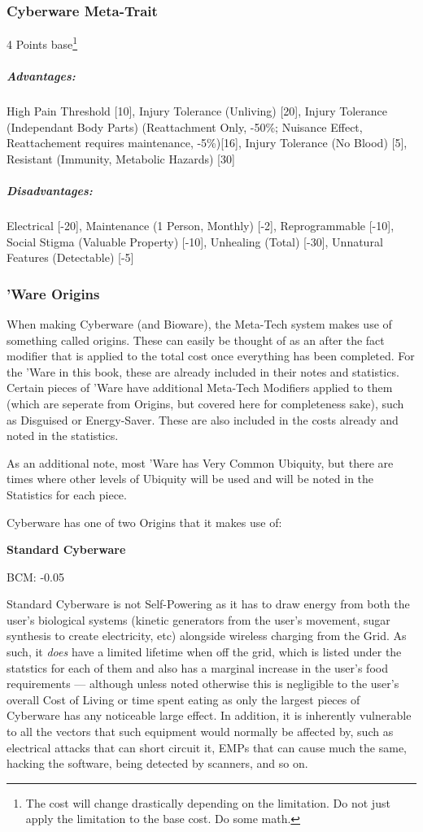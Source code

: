 \begin{multicols*}{3}
	\subsubsection*{Cyberware Meta-Trait}
	\begin{flushright}
		4 Points base\footnote{The cost will change drastically depending on the limitation. Do not just apply the limitation to the base cost. Do some math.}
	\end{flushright}
	\subparagraph{Advantages:}
	High Pain Threshold [10], Injury Tolerance (Unliving) [20], Injury Tolerance (Independant Body Parts) (Reattachment Only, -50\%; Nuisance Effect, Reattachement requires maintenance, -5\%)[16], Injury Tolerance (No Blood) [5], Resistant (Immunity, Metabolic Hazards) [30]
	\subparagraph{Disadvantages:}
	Electrical [-20], Maintenance (1 Person, Monthly) [-2], Reprogrammable [-10], Social Stigma (Valuable Property) [-10], Unhealing (Total) [-30], Unnatural Features (Detectable) [-5]
	
	\subsubsection{'Ware Origins}
	
	When making Cyberware (and Bioware), the \GURPS Meta-Tech system makes use of something called origins. These can easily be thought of as an after the fact modifier that is applied to the total cost once everything has been completed. For the 'Ware in this book, these are already included in their notes and statistics. Certain pieces of 'Ware have additional Meta-Tech Modifiers applied to them (which are seperate from Origins, but covered here for completeness sake), such as Disguised or Energy-Saver. These are also included in the costs already and noted in the statistics. 
	
	As an additional note, most 'Ware has Very Common Ubiquity, but there are times where other levels of Ubiquity will be used and will be noted in the Statistics for each piece.
	
	Cyberware has one of two Origins that it makes use of: 
	
	\noindent
	\textbf{Standard Cyberware}
	
	BCM: -0.05
	
	Standard Cyberware is not Self-Powering as it has to draw energy from both the user's biological systems (kinetic generators from the user's movement, sugar synthesis to create electricity, etc) alongside wireless charging from the Grid. As such, it \textit{does} have a limited lifetime when off the grid, which is listed under the statstics for each of them and also has a marginal increase in the user's food requirements — although unless noted otherwise this is negligible to the user's overall Cost of Living or time spent eating as only the largest pieces of Cyberware has any noticeable large effect. In addition, it is inherently vulnerable to all the vectors that such equipment would normally be affected by, such as electrical attacks that can short circuit it, EMPs that can cause much the same, hacking the software, being detected by scanners, and so on.
	

\end{multicols*}
